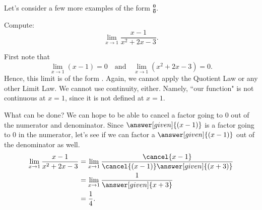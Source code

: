 \documentclass{ximera}
\begin{document}
Let's consider a few more examples of the form $\boldsymbol{\tfrac{0}{0}}$.

\begin{example}
  Compute:
  \[
  \lim_{x\to1}\frac{x-1}{x^2+2x-3}.
  \]
  \begin{explanation}
    First note that
    \[
    \lim_{x\to1}\left(x-1\right)=0 \quad\text{and}\quad  \lim_{x\to1}\left(x^2+2x-3\right) = 0.
    \]
    Hence, this limit is of the form . Again, we cannot apply the Quotient Law or any other Limit Law. We cannot use continuity, either. Namely, ``our function" is not continuous at $x=1$, since it is not defined 
    at $x=1$. 
    
    What can be done? We can hope to be able to  cancel a factor going to $0$ out of the numerator and
    denominator.  Since $\answer[given]{(x-1)}$ is a factor going to $0$ in the
    numerator, let's see if we can factor a $\answer[given]{(x-1)}$ out of the
    denominator as well.
    \begin{align*}
      \lim_{x\to1}\frac{x-1}{x^2+2x-3}&=\lim_{x\to1}\frac{\cancel{x-1}}{\cancel{(x-1)}\answer[given]{(x+3)}} \\
      &=\lim_{x\to1}\frac{1}{\answer[given]{x+3}}\\
      &=\frac{1}{4}.
    \end{align*}
  \end{explanation}
\end{example}
\end{document}
